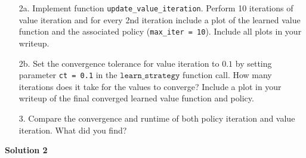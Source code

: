 \documentclass[submit]{harvardml}
\begin{document}
\begin{framed}
\begin{itemize}
    \item [2a.] Implement function
      \texttt{update\_value\_iteration}. Perform 10 iterations of
      value iteration and for every 2nd iteration include a plot of
      the learned value function and the associated policy
      (\texttt{max\_iter = 10}).  Include all plots in your writeup. 

    \item [2b.] Set the convergence tolerance for value iteration to
      $0.1$ by setting parameter \texttt{ct = 0.1} in the
      $\texttt{learn\_strategy}$ function call.  How many iterations
      does it take for the values to converge? Include a plot in your writeup of the final converged learned value function and policy.

      
\item[3.]  Compare the convergence and runtime of both policy iteration and value iteration.  What did you find?
\end{itemize}
\end{framed}
\newpage
\textbf{Solution 2}







\newpage
\end{document}
